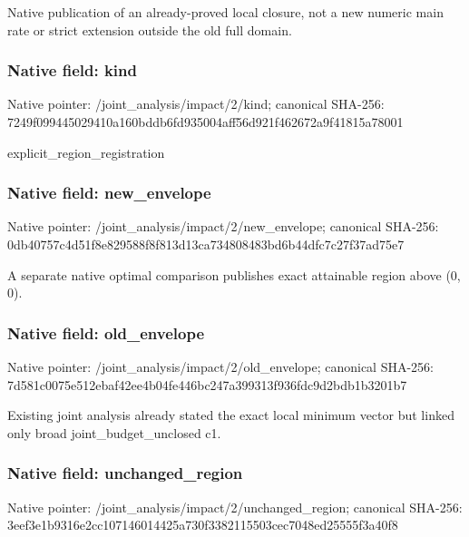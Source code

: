 \documentclass[10pt,a4paper]{article}
\begin{document}
\begingroup\raggedright\sloppy Native publication of an already-proved local closure,\allowbreak{} not a new numeric main rate or strict extension outside the old full domain.\par\endgroup

\subsubsection{Native field: kind}
Native pointer: /joint\_\allowbreak{}analysis/impact/2/kind; canonical SHA-256: 7249f099445029410a160bddb6fd935004aff56d921f462672a9f41815a78001

\begingroup\raggedright\sloppy explicit\_\allowbreak{}region\_\allowbreak{}registration\par\endgroup

\subsubsection{Native field: new\_\allowbreak{}envelope}
Native pointer: /joint\_\allowbreak{}analysis/impact/2/new\_\allowbreak{}envelope; canonical SHA-256: 0db40757c4d51f8e829588f8f813d13ca734808483bd6b44dfc7c27f37ad75e7

\begingroup\raggedright\sloppy A separate native optimal comparison publishes exact attainable region above (0,\allowbreak{} 0).\par\endgroup

\subsubsection{Native field: old\_\allowbreak{}envelope}
Native pointer: /joint\_\allowbreak{}analysis/impact/2/old\_\allowbreak{}envelope; canonical SHA-256: 7d581c0075e512ebaf42ee4b04fe446bc247a399313f936fdc9d2bdb1b3201b7

\begingroup\raggedright\sloppy Existing joint analysis already stated the exact local minimum vector but linked only broad joint\_\allowbreak{}budget\_\allowbreak{}unclosed c1.\par\endgroup

\subsubsection{Native field: unchanged\_\allowbreak{}region}
Native pointer: /joint\_\allowbreak{}analysis/impact/2/unchanged\_\allowbreak{}region; canonical SHA-256: 3eef3e1b9316e2cc107146014425a730f3382115503cec7048ed25555f3a40f8
\end{document}
